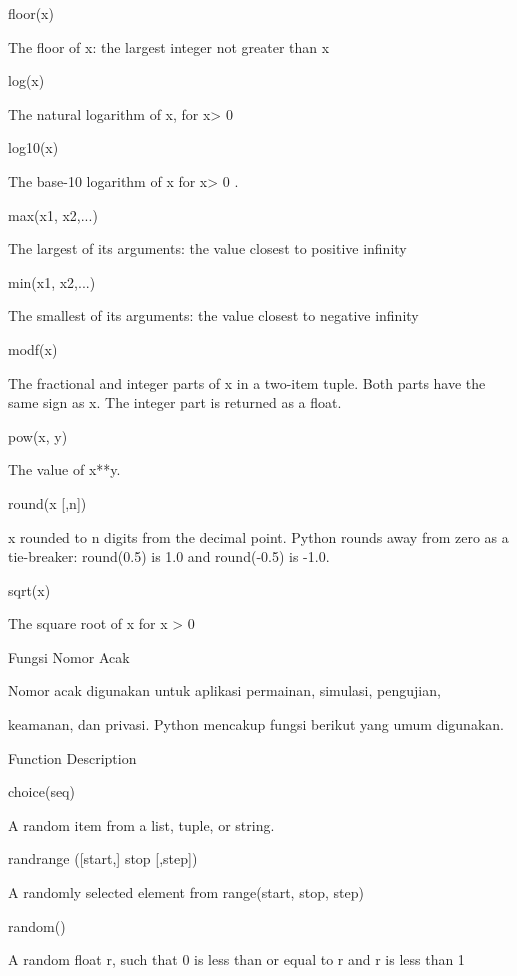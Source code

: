 floor(x)  \par
The floor of x: the largest integer not greater than x \par
log(x)  \par
The natural logarithm of x, for x> 0  \par
log10(x)  \par
The base-10 logarithm of x for x> 0 . \par
max(x1, x2,...)  \par
The largest of its arguments: the value closest to positive infinity  \par
min(x1, x2,...)  \par
The smallest of its arguments: the value closest to negative infinity  \par
modf(x)  \par
The fractional and integer parts of x in a two-item tuple. Both parts have the same sign as x. The integer part is returned as a float. \par
pow(x, y) \par
The value of x**y. \par
round(x [,n]) \par
x rounded to n digits from the decimal point. Python rounds away from zero as a tie-breaker: round(0.5) is 1.0 and round(-0.5) is -1.0. \par
sqrt(x)  \par
The square root of x for x > 0 \par
\vspace{12pt}
Fungsi Nomor Acak \par
\vspace{12pt}
Nomor acak digunakan untuk aplikasi permainan, simulasi, pengujian,  \par
\vspace{12pt}
keamanan, dan privasi. Python mencakup fungsi berikut yang umum digunakan. \par
\vspace{12pt}
Function \hspace*{0.5in} Description \par
choice(seq) \par
A random item from a list, tuple, or string. \par
randrange ([start,] stop [,step])  \par
A randomly selected element from range(start, stop, step) \par
random()  \par
A random float r, such that 0 is less than or equal to r and r is less than 1 \par
